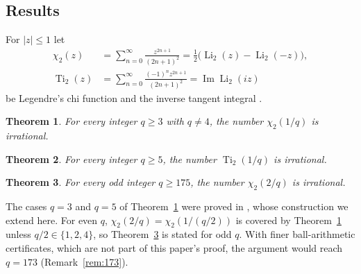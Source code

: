 \documentclass[11pt]{amsart}
\newtheorem{mainthm}{Theorem}
\theoremstyle{definition}
\theoremstyle{remark}
\numberwithin{equation}{section}
\newcommand{\Li}{\operatorname{Li}}
\newcommand{\Ti}{\operatorname{Ti}}
\begin{document}
\subsection{Results}
For $|z|\le1$ let
\begin{align*}
  \chi_2(z)&=\sum_{n=0}^{\infty}\frac{z^{2n+1}}{(2n+1)^2}=\tfrac12\bigl(\Li_2(z)-\Li_2(-z)\bigr),\\
  \Ti_2(z)&=\sum_{n=0}^{\infty}\frac{(-1)^nz^{2n+1}}{(2n+1)^2}=\operatorname{Im}\Li_2(iz)
\end{align*}
be Legendre's chi function and the inverse tangent integral \cite[\S1.8, Ch.~2]{Lewin1981}.

\begin{mainthm}\label{thm:A}
For every integer $q\ge3$ with $q\ne4$, the number $\chi_2(1/q)$ is irrational.
\end{mainthm}

\begin{mainthm}\label{thm:B}
For every integer $q\ge5$, the number $\Ti_2(1/q)$ is irrational.
\end{mainthm}

\begin{mainthm}\label{thm:C}
For every odd integer $q\ge175$, the number $\chi_2(2/q)$ is irrational.
\end{mainthm}

The cases $q=3$ and $q=5$ of Theorem~\ref{thm:A} were proved in \cite{Chi2Paper}, whose construction we extend here.
For even $q$, $\chi_2(2/q)=\chi_2(1/(q/2))$ is covered by Theorem~\ref{thm:A} unless $q/2\in\{1,2,4\}$, so
Theorem~\ref{thm:C} is stated for odd $q$. With finer ball-arithmetic certificates, which are not part of this paper's
proof, the argument would reach $q=173$ (Remark~\ref{rem:173}).
\end{document}
